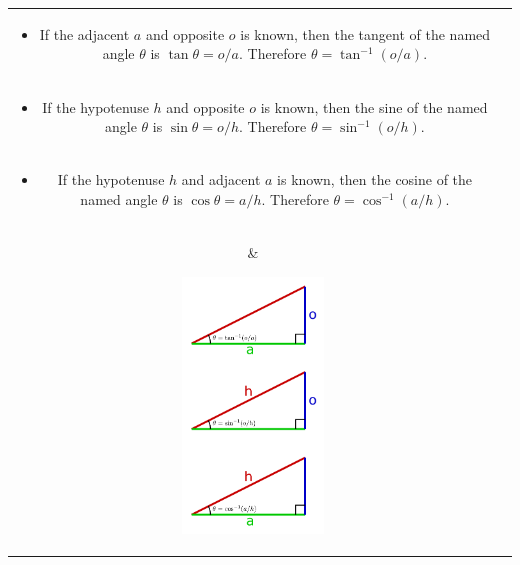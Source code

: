 \documentclass{article}
\begin{document}
\begin{tabular}{cc}
\parbox{0.5\textwidth}{
\begin{itemize}
\item If the adjacent \(a\) and opposite \(o\) is known, then the tangent of the named angle \(\theta\) is \(\tan\theta = o/a\). Therefore \(\theta = \tan^{-1}(o/a)\). \\ ~ \\
\item If the hypotenuse \(h\) and opposite \(o\) is known, then the sine of the named angle \(\theta\) is \(\sin\theta = o/h\). Therefore \(\theta = \sin^{-1}(o/h)\). \\ ~ \\ 
\item If the hypotenuse \(h\) and adjacent \(a\) is known, then the cosine of the named angle \(\theta\) is \(\cos\theta = a/h\). Therefore \(\theta = \cos^{-1}(a/h)\). \\ ~ \\
\end{itemize}
} & \parbox{0.3\textwidth}{
\includegraphics[width = 0.3\textwidth]{inverse_trig_scenarios}
}
\end{tabular}
\end{document}
